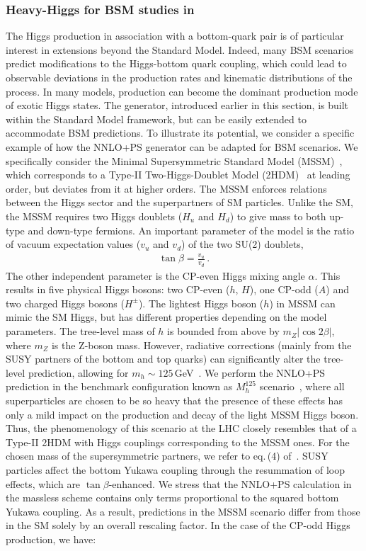 \documentclass[11pt,a4paper]{article}
\begin{document}
\subsubsection{Heavy-Higgs for BSM studies in \minnlo{}}

The Higgs production in association with a bottom-quark pair is of particular interest in extensions beyond the Standard Model. Indeed, many BSM scenarios predict modifications to the Higgs-bottom quark coupling, which could lead to observable deviations in the production rates and kinematic distributions of the \bbH{} process. In many models, \bbH{} production can become the dominant production mode of exotic Higgs states. The \minnlo{} generator, introduced earlier in this section, is built within the Standard Model framework, but can be easily extended to accommodate BSM predictions. To illustrate its potential, we consider a specific example of how the NNLO+PS generator can be adapted for BSM scenarios. We specifically consider the Minimal Supersymmetric Standard Model (MSSM)~\cite{Ovrut:1984uc,Haber:1984rc,Gunion:1984yn}, which corresponds to a Type-II Two-Higgs-Doublet Model (2HDM)~\cite{Branco:2011iw} at leading order, but deviates from it at higher orders. The MSSM enforces relations between the Higgs sector and the superpartners of SM particles. Unlike the SM, the MSSM requires two Higgs doublets ($H_u$ and $H_d$) to give mass to both up-type and down-type fermions. An important parameter of the model is the ratio of vacuum expectation values ($v_u$ and $v_d$) of the two SU(2) doublets,
\begin{align}
	\tan\beta=\frac{v_u}{v_d}\,.
\end{align}
The other independent parameter is the CP-even Higgs mixing angle $\alpha$. This results in five physical Higgs bosons: two CP-even ($h$, $H$), one CP-odd ($A$) and two charged Higgs bosons ($H^{\pm}$). The lightest Higgs boson ($h$) in MSSM can mimic the SM Higgs, but has different properties depending on the model parameters. The tree-level mass of $h$ is bounded from above by $m_Z |\cos 2\beta|$, where $m_Z$ is the Z-boson mass. However, radiative corrections (mainly from the SUSY partners of the bottom and top quarks) can significantly alter the tree-level prediction, allowing for $m_h\sim 125$\,GeV~\cite{Heinemeyer:2011aa,Bechtle:2012jw,Draper:2016pys,Bechtle:2016kui,Haber:2017erd}. We perform the NNLO+PS prediction in the benchmark configuration known as $M_h^{125}$ scenario~\cite{Bagnaschi:2018ofa}, where all superparticles are chosen to be so heavy that the presence of these effects has only a mild impact on the production and decay of the light MSSM Higgs boson. Thus, the phenomenology of this scenario at the LHC closely resembles that of a Type-II 2HDM with Higgs couplings corresponding to the MSSM ones. For the chosen mass of the supersymmetric partners, we refer to eq.\,(4) of~. SUSY particles affect the bottom Yukawa coupling through the resummation of loop effects, which are $\tan\beta$-enhanced. We stress that the NNLO+PS calculation in the massless scheme contains only terms proportional to the squared bottom Yukawa coupling. As a result, \bbH{} predictions in the MSSM scenario differ from those in the SM solely by an overall rescaling factor. In the case of the CP-odd Higgs production, we have:
\end{document}
